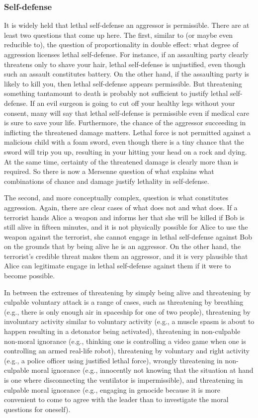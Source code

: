 \subsubsection{Self-defense}
It is widely held that lethal self-defense an aggressor is permissible. There are at least two questions that come up here.
The first, similar to (or maybe even reducible to), the question of proportionality in double effect: what degree of aggression licenses lethal self-defense. For instance, if an assaulting party clearly threatens only to shave your hair, lethal self-defense is unjustified, even though such an assault constitutes battery. On the other hand, if the assaulting party is likely to kill you, then lethal self-defense appears permissible. But threatening something tantamount to death is probably not sufficient to justify lethal self-defense. If an evil surgeon is going to cut off your healthy legs without your consent, many will say that lethal self-defense is permissible even if medical care is sure to save your life. Furthermore, the chance of the aggressor succeeding in inflicting the threatened damage matters. Lethal force is not permitted against a malicious child with a foam sword, even though there is a tiny chance that the sword will trip you up, resulting in your hitting your head on a rock and dying. At the same time, certainty of the threatened damage is clearly more than is required. So there is now a Mersenne question of what explains what combinations of chance and damage justify lethality in self-defense.

The second, and more conceptually complex, question is what constitutes aggression. Again, there are clear cases of what does not 
and what does. If a terrorist hands Alice a weapon and informs her that she will be killed if Bob is still alive in fifteen 
minutes, and it is not physically possible for Alice to use the weapon against the terrorist, she cannot engage in lethal 
self-defense against Bob on the grounds that by being alive he is an aggressor. On the other hand, the terrorist's credible threat 
makes them an aggressor, and it is very plausible that Alice can legitimate engage in lethal self-defense against them if it were 
to become possible.

In between the extremes of threatening by simply being alive and threatening by culpable voluntary attack is a range of cases, 
such as threatening by breathing (e.g., there is only enough air in spaceship for one of two people), threatening
by involuntary activity similar to voluntary activity (e.g., a muscle spasm is about to happen resulting in a detonator 
being activated), threatening in non-culpable non-moral ignorance (e.g., thinking one is controlling a video game when one is controlling an armed real-life robot), threatening by voluntary and right activity (e.g., a police officer using justified lethal force), wrongly threatening in non-culpable moral ignorance (e.g., innocently not knowing that the situation at hand is one where disconnecting the ventilator is impermissible), and threatening in culpable moral ignorance (e.g., engaging in genocide because
it is more convenient to come to agree with the leader than to investigate the moral questions for oneself). 

